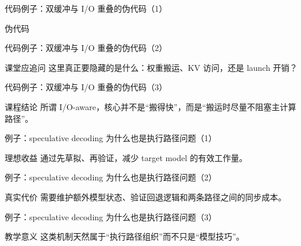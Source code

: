 \begin{frame}{代码例子：双缓冲与 I/O 重叠的伪代码（1）}
\begin{block}{伪代码}
    {\ttfamily\small
    \par
    \par
    \par
    }
  \end{block}
\end{frame}

\begin{frame}{代码例子：双缓冲与 I/O 重叠的伪代码（2）}
\begin{block}{课堂应追问}
    这里真正要隐藏的是什么：权重搬运、KV 访问，还是 launch 开销？
  \end{block}
\end{frame}

\begin{frame}{代码例子：双缓冲与 I/O 重叠的伪代码（3）}
\begin{block}{课程结论}
    所谓 I/O-aware，核心并不是“搬得快”，而是“搬运时尽量不阻塞主计算路径”。
  \end{block}
\end{frame}

\begin{frame}{例子：speculative decoding 为什么也是执行路径问题（1）}
\begin{block}{理想收益}
    通过先草拟、再验证，减少 target model 的有效工作量。
  \end{block}
\end{frame}

\begin{frame}{例子：speculative decoding 为什么也是执行路径问题（2）}
\begin{block}{真实代价}
    需要维护额外模型状态、验证回退逻辑和两条路径之间的同步成本。
  \end{block}
\end{frame}

\begin{frame}{例子：speculative decoding 为什么也是执行路径问题（3）}
\begin{block}{教学意义}
    这类机制天然属于“执行路径组织”而不只是“模型技巧”。
  \end{block}
\end{frame}

